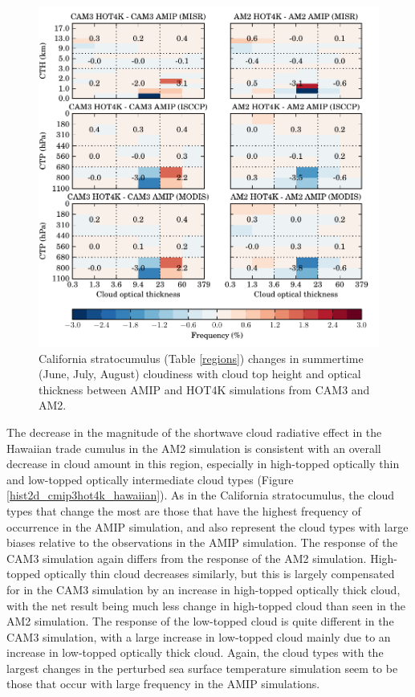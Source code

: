 \begin{figure}
    \centering
    \includegraphics{../graphics/hist2d_cmip3hot4k_california.pdf}
    \caption[California stratocumulus changes in summertime cloudiness with cloud top height and optical thickness between AMIP and HOT4K simulations from CAM3 and AM2.]{California stratocumulus (Table \ref{regions}) changes in summertime (June, July, August) cloudiness with cloud top height and optical thickness between AMIP and HOT4K simulations from CAM3 and AM2.}
    \label{hist2d_cmip3hot4k_california}
\end{figure}

The decrease in the magnitude of the shortwave cloud radiative effect in the Hawaiian trade cumulus in the AM2 simulation is consistent with an overall decrease in cloud amount in this region, especially in high-topped optically thin and low-topped optically intermediate cloud types (Figure \ref{hist2d_cmip3hot4k_hawaiian}). As in the California stratocumulus, the cloud types that change the most are those that have the highest frequency of occurrence in the AMIP simulation, and also represent the cloud types with large biases relative to the observations in the AMIP simulation. The response of the CAM3 simulation again differs from the response of the AM2 simulation. High-topped optically thin cloud decreases similarly, but this is largely compensated for in the CAM3 simulation by an increase in high-topped optically thick cloud, with the net result being much less change in high-topped cloud than seen in the AM2 simulation. The response of the low-topped cloud is quite different in the CAM3 simulation, with a large increase in low-topped cloud mainly due to an increase in low-topped optically thick cloud. Again, the cloud types with the largest changes in the perturbed sea surface temperature simulation seem to be those that occur with large frequency in the AMIP simulations.

